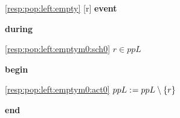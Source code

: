 \noindent \ref{resp:pop:left:empty} [r] \textbf{event}
\begin{block}
  \item   \textbf{during}
  \begin{block}
  \item[ \eqref{resp:pop:left:emptym0:sch0} ]{$r \in ppL $} %
  \end{block}
  \item   \textbf{begin}
  \begin{block}
  \item[ \eqref{resp:pop:left:emptym0:act0} ]{$ppL \mathrel{:\mkern1mu=} ppL \setminus \{ r \} $} %
  \end{block}
  \item   \textbf{end} \\
\end{block}

